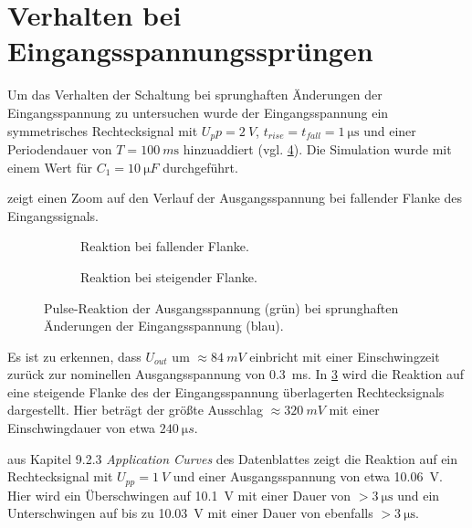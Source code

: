 	\section{Verhalten bei Eingangsspannungssprüngen}
		Um das Verhalten der Schaltung bei sprunghaften Änderungen der Eingangsspannung zu untersuchen wurde der Eingangsspannung ein symmetrisches Rechtecksignal
		mit \({U_pp} = \SI{2}{V}\), \(t_{rise} = t_{fall} = \SI{1}{\micro \second}\) und einer Periodendauer von \(T = \SI{100}{m \second}\) hinzuaddiert (vgl. \cref{fig:pulsefigs}).
		Die Simulation wurde mit einem Wert für \(C_1 = \SI{10}{\micro F}\) durchgeführt.\par\medskip
		 zeigt einen Zoom auf den Verlauf der Ausgangsspannung bei fallender Flanke des Eingangssignals.
		\begin{figure}[h]
			\centering
			\begin{subfigure}[t]{.8\textwidth}
				\centering
				
				\caption{}
				\label{subfig:pulse}
			\end{subfigure}
			\begin{subfigure}[l]{.4\textwidth}
				\centering
				
				\caption{Reaktion bei fallender Flanke.}
				\label{subfig:sag}
			\end{subfigure}
			\hfill
			\begin{subfigure}[r]{.4\textwidth}
				\centering
				
				\caption{Reaktion bei steigender Flanke.}
				\label{subfig:spike}
			\end{subfigure}
			\caption[Puls-Reaktion der Ausgangsspannung bei sprunghaften Änderungen der Eingangsspannung]{Pulse-Reaktion der Ausgangsspannung (grün) bei sprunghaften Änderungen der Eingangsspannung (blau).}
			\label{fig:pulsefigs}
		\end{figure}
		Es ist zu erkennen, dass \(U_{out}\) um \(\approx \SI{84}{mV}\) einbricht mit einer Einschwingzeit zurück zur nominellen Ausgangsspannung von \SI{0,3}{ms}.
		In \cref{subfig:spike} wird die Reaktion auf eine steigende Flanke des der Eingangsspannung überlagerten Rechtecksignals dargestellt.
		Hier beträgt der größte Ausschlag \(\approx \SI{320}{mV}\) mit einer Einschwingdauer von etwa \(\SI{240}{\micro s}\).\par\medskip
		 aus Kapitel 9.2.3 \textit{Application Curves} des Datenblattes zeigt die Reaktion auf ein Rechtecksignal mit \(U_{pp} = \SI{1}{V}\)
		und einer Ausgangsspannung von etwa \SI{10,06}{V}. Hier wird ein Überschwingen auf \SI{10,1}{V} mit einer Dauer von \(> \SI{3}{\micro \second}\)
		und ein Unterschwingen auf bis zu \SI{10,03}{V} mit einer Dauer von ebenfalls \(> \SI{3}{\micro \second}\).
	\newpage
